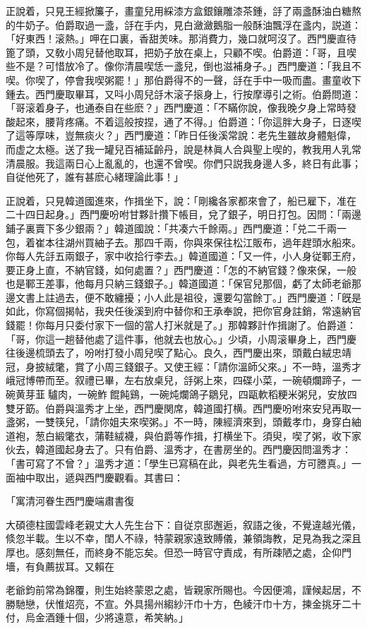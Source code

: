 正說着，只見王經掀簾子，畫童兒用綵漆方盒銀鑲雕漆茶鍾，㧱了兩盞酥油白糖熬的牛奶子。伯爵取過一盞，㧱在手内，見白瀲瀲鵝脂一般酥油飄浮在盞内，説道：「好東西！滚熱。」呷在口裏，香甜羙味。那消費力，幾口就呵沒了。西門慶直待篦了頭，又敎小周兒替他取耳，把奶子放在桌上，只顧不喫。伯爵道：「哥，且喫些不是？可惜放冷了。像你清晨喫恁一盞兒，倒也滋補身子。」西門慶道：「我且不喫。你喫了，停會我喫粥罷！」那伯爵得不的一聲，㧱在手中一吸而盡。畫童收下鍾去。西門慶取畢耳，又呌小周兒㧱木滚子㨰身上，行按摩導引之術。伯爵問道：「哥滚着身子，也通泰自在些麽？」西門慶道：「不瞞你說，像我晚夕身上常時發酸起來，腰背疼痛。不着這般按捏，通了不得。」伯爵道：「你這胖大身子，日逐喫了這等厚味，豈無痰火？」西門慶道：「昨日任後溪常說：老先生雖故身體魁偉，而虚之太極。送了我一罐兒百補延齡丹，說是林眞人合與聖上喫的，教我用人乳常清晨服。我這兩日心上亂亂的，也還不曾喫。你們只説我身邊人多，終日有此事；自従他死了，誰有甚麽心緒理論此事！」

正說着，只見韓道國進來，作揖坐下，說：「剛纔各家都來會了，船已雇下，准在二十四日起身。」西門慶吩咐甘夥計攢下帳目，兌了銀子，明日打包。因問：「兩邊鋪子裏賣下多少銀兩？」韓道國說：「共凑六千餘兩。」西門慶道：「兑二千兩一包，着崔本往湖州買紬子去。那四千兩，你與來保往松江販布，過年趕頭水船來。你每人先㧱五兩銀子，家中收拾行李去。」韓道國道：「又一件，小人身従鄆王府，要正身上直，不納官錢，如何處置？」西門慶道：「怎的不納官錢？像來保，一般也是鄆王差事，他每月只納三錢銀子。」韓道國道：「保官兒那個，虧了太師老爺那邊文書上註過去，便不敢纏擾；小人此是祖役，還要勾當餘丁。」西門慶道：「旣是如此，你寫個揭帖，我央任後溪到府中替你和王承奉說，把你官身註銷，常遠納官錢罷！你每月只委付家下一個的當人打米就是了。」那韓夥計作揖謝了。伯爵道：「哥，你這一趟替他處了這件事，他就去也放心。」少頃，小周滚畢身上，西門慶往後邊梳頭去了，吩咐打發小周兒喫了點心。良久，西門慶出來，頭戴白絨忠靖冠，身披絨氅，賞了小周三錢銀子。又使王經：「請你溫師父來。」不一時，溫秀才峨冠博帶而至。叙禮已畢，左右放桌兒，㧱粥上來，四碟小菜，一碗頓爛蹄子，一碗黄芽韮𤆑驢肉，一碗鮓𤆑餛飩鷄，一碗炖爛鴿子鶵兒，四甌軟稻粳米粥兒，安放四雙牙筯。伯爵與溫秀才上坐，西門慶関席，韓道國打横。西門慶吩咐來安兒再取一盞粥，一雙筷兒，「請你姐夫來喫粥。」不一時，陳經濟來到，頭戴孝巾，身穿白紬道袍，葱白緞氅衣，蒲鞋絨襪，與伯爵等作揖，打横坐下。須臾，喫了粥，收下家伙去，韓道國起身去了。只有伯爵、溫秀才，在書房坐的。西門慶因問溫秀才：「書可寫了不曾？」溫秀才道：「學生已寫稿在此，與老先生看過，方可謄真。」一面袖中取出，遞與西門慶觀看。其書曰：

\begin{myquote}[\markfont]
\hspace*{4em}「寓清河眷生西門慶端肅書復

大碩德柱國雲峰老親丈大人先生台下：自従京邸邂逅，叙語之後，不覺違越光儀，倐忽半載。生以不幸，閨人不祿，特蒙親家遠致賻儀，兼領誨教，足見為我之深且厚也。感刻無任，而終身不能忘矣。但恐一時官守責成，有所疎陋之處，企仰門墻，有負薦拔耳。又賴在

老爺鈞前常為錦覆，則生始終蒙恩之處，皆親家所賜也。今因便鴻，謹候起居，不勝馳戀，伏惟炤亮，不宣。外具揚州縐紗汗巾十方，色綾汗巾十方，揀金挑牙二十付，烏金酒鍾十個，少將遠意，希笑納。」
\end{myquote}

